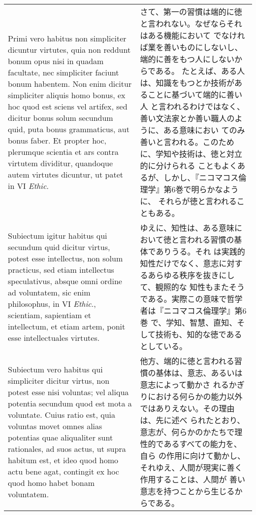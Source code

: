 \documentclass[10pt]{jsarticle}
\begin{document}
\begin{longtable}{p{21em}p{21em}}
\\

Primi vero habitus non simpliciter dicuntur virtutes, quia non reddunt
bonum opus nisi in quadam facultate, nec simpliciter faciunt bonum
habentem. Non enim dicitur simpliciter aliquis homo bonus, ex hoc quod
est sciens vel artifex, sed dicitur bonus solum secundum quid, puta
bonus grammaticus, aut bonus faber. Et propter hoc, plerumque scientia
et ars contra virtutem dividitur, quandoque autem virtutes dicuntur,
ut patet in VI {\itshape Ethic}.

&

さて、第一の習慣は端的に徳と言われない。なぜならそれはある機能において
でなければ業を善いものにしないし、端的に善をもつ人にしないからである。
たとえば、ある人は、知識をもつとか技術があることに基づいて端的に善い人
と言われるわけではなく、善い文法家とか善い職人のように、ある意味におい
てのみ善いと言われる。このために、学知や技術は、徳と対立的に分けられる
こともよくあるが、しかし、『ニコマコス倫理学』第6巻で明らかなように、
それらが徳と言われることもある。
 
\\

Subiectum igitur habitus qui secundum quid dicitur virtus, potest esse
intellectus, non solum practicus, sed etiam intellectus speculativus,
absque omni ordine ad voluntatem, sic enim philosophus, in VI
{\itshape Ethic}., scientiam, sapientiam et intellectum, et etiam
artem, ponit esse intellectuales virtutes.

&

ゆえに、知性は、ある意味において徳と言われる習慣の基体でありうる。それ
は実践的知性だけでなく、意志に対するあらゆる秩序を抜きにして、観照的な
知性もまたそうである。実際この意味で哲学者は『ニコマコス倫理学』第6巻
で、学知、智慧、直知、そして技術も、知的な徳であるとしている。
 
\\

Subiectum vero habitus qui simpliciter dicitur virtus, non potest esse
nisi voluntas; vel aliqua potentia secundum quod est mota a
voluntate. Cuius ratio est, quia voluntas movet omnes alias potentias
quae aliqualiter sunt rationales, ad suos actus, ut supra habitum est,
et ideo quod homo actu bene agat, contingit ex hoc quod homo habet
bonam voluntatem.

&

他方、端的に徳と言われる習慣の基体は、意志、あるいは意志によって動かさ
れるかぎりにおける何らかの能力以外ではありえない。その理由は、先に述べ
られたとおり、意志が、何らかのかたちで理性的であるすべての能力を、自ら
の作用に向けて動かし、それゆえ、人間が現実に善く作用することは、人間が
善い意志を持つことから生じるからである。


\end{longtable}
\end{document}
